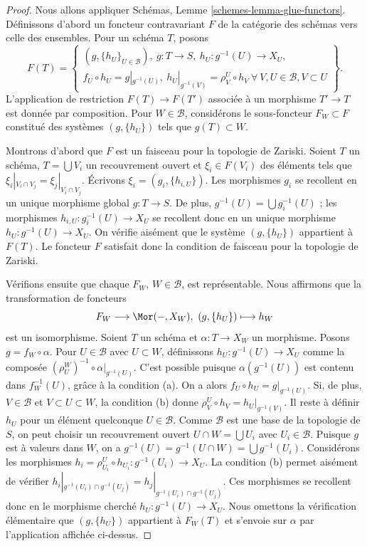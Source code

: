 \begin{proof}
Nous allons appliquer Schémas, Lemme \ref{schemes-lemma-glue-functors}.
Définissons d'abord un foncteur contravariant $F$ de la catégorie des
schémas vers celle des ensembles. Pour un schéma $T$, posons
$$
F(T) =
\left\{
\begin{matrix}
(g, \{h_U\}_{U \in \mathcal{B}}),
\ g : T \to S, \ h_U : g^{-1}(U) \to X_U, \\
f_U \circ h_U = g|_{g^{-1}(U)},
\ h_U|_{g^{-1}(V)} = \rho^U_V \circ h_V
\ \forall\ V, U \in \mathcal{B}, V \subset U
\end{matrix}
\right\}.
$$
L'application de restriction $F(T) \to F(T')$ associée à un morphisme
$T' \to T$ est donnée par composition. Pour $W \in \mathcal{B}$,
considérons le sous-foncteur $F_W \subset F$ constitué des systèmes
$(g, \{h_U\})$ tels que $g(T) \subset W$.

\medskip\noindent
Montrons d'abord que $F$ est un faisceau pour la topologie de Zariski.
Soient $T$ un schéma, $T = \bigcup V_i$ un recouvrement ouvert et
$\xi_i \in F(V_i)$ des éléments tels que
$\xi_i|_{V_i \cap V_j} = \xi_j|_{V_i \cap V_j}$.
Écrivons $\xi_i = (g_i, \{h_{i, U}\})$.
Les morphismes $g_i$ se recollent en un unique morphisme global
$g : T \to S$. De plus, $g^{-1}(U) = \bigcup g_i^{-1}(U)$ ; les morphismes
$h_{i, U} : g_i^{-1}(U) \to X_U$ se recollent donc en un unique morphisme
$h_U : g^{-1}(U) \to X_U$. On vérifie aisément que le système
$(g, \{h_U\})$ appartient à $F(T)$. Le foncteur $F$ satisfait donc la
condition de faisceau pour la topologie de Zariski.

\medskip\noindent
Vérifions ensuite que chaque $F_W$, $W \in \mathcal{B}$, est représentable.
Nous affirmons que la transformation de foncteurs
$$
F_W \longrightarrow \Mor(-, X_W), \ (g, \{h_U\}) \longmapsto h_W
$$
est un isomorphisme. Soient $T$ un schéma et $\alpha : T \to X_W$ un
morphisme. Posons $g = f_W \circ \alpha$.
Pour $U \in \mathcal{B}$ avec $U \subset W$, définissons
$h_U : g^{-1}(U) \to X_U$ comme la composée
$(\rho^W_U)^{-1} \circ \alpha|_{g^{-1}(U)}$.
C'est possible puisque $\alpha(g^{-1}(U))$ est contenu dans $f_W^{-1}(U)$,
grâce à la condition (a). On a alors $f_U \circ h_U = g|_{g^{-1}(U)}$.
Si, de plus, $V \in \mathcal{B}$ et $V \subset U \subset W$, la condition
(b) donne $\rho^U_V \circ h_V = h_U|_{g^{-1}(V)}$.
Il reste à définir $h_U$ pour un élément quelconque $U \in \mathcal{B}$.
Comme $\mathcal{B}$ est une base de la topologie de $S$, on peut choisir
un recouvrement ouvert $U \cap W = \bigcup U_i$ avec $U_i \in \mathcal{B}$.
Puisque $g$ est à valeurs dans $W$, on a
$g^{-1}(U) = g^{-1}(U \cap W) = \bigcup g^{-1}(U_i)$.
Considérons les morphismes
$h_i = \rho^U_{U_i} \circ h_{U_i} : g^{-1}(U_i) \to X_U$.
La condition (b) permet aisément de vérifier
$h_i|_{g^{-1}(U_i) \cap g^{-1}(U_j)} = h_j|_{g^{-1}(U_i) \cap g^{-1}(U_j)}$.
Ces morphismes se recollent donc en le morphisme cherché
$h_U : g^{-1}(U) \to X_U$. Nous omettons la vérification élémentaire que
$(g, \{h_U\})$ appartient à $F_W(T)$ et s'envoie sur $\alpha$ par
l'application affichée ci-dessus.


\end{proof}
